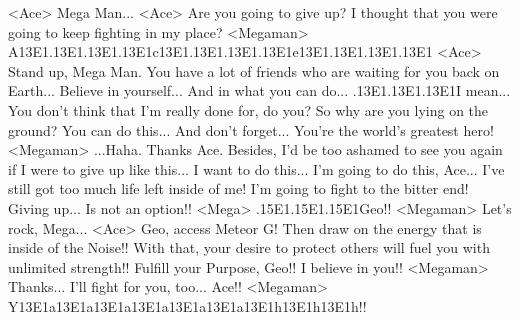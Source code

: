 <Ace> Mega Man... 
<Ace> Are you going to give up? 
I thought that you were going to keep fighting in my place? 
<Megaman> A{13}{E1}.{13}{E1}.{13}{E1}.{13}{E1}c{13}{E1}.{13}{E1}.{13}{E1}.{13}{E1}e{13}{E1}.{13}{E1}.{13}{E1}.{13}{E1} 
<Ace> Stand up, Mega Man. 
You have a lot of friends who are waiting for you back on Earth... 
Believe in yourself... And in what you can do... 
.{13}{E1}.{13}{E1}.{13}{E1}I mean... You don't think that I'm really done for, do you? 
So why are you lying on the ground? 
You can do this... 
And don't forget... You're the world's greatest hero! 
<Megaman> ...Haha. Thanks Ace. 
Besides, I'd be too ashamed to see you again if I were to give up like this... 
I want to do this... 
I'm going to do this, Ace... 
I've still got too much life left inside of me! 
I'm going to fight to the bitter end! 
Giving up... Is not an option!! 
<Mega> .{15}{E1}.{15}{E1}.{15}{E1}Geo!! 
<Megaman> Let's rock, Mega... 
<Ace> Geo, access Meteor G! 
Then draw on the energy that is inside of the Noise!! 
With that, your desire to protect others will fuel you with unlimited strength!! 
Fulfill your Purpose, Geo!! 
I believe in you!! 
<Megaman> Thanks... I'll fight for you, too... 
Ace!! 
<Megaman> Y{13}{E1}a{13}{E1}a{13}{E1}a{13}{E1}a{13}{E1}a{13}{E1}a{13}{E1}h{13}{E1}h{13}{E1}h!! 
